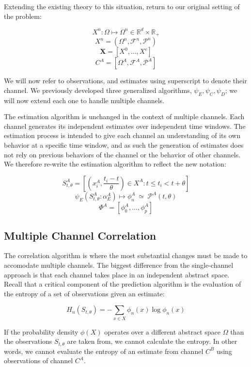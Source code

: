 \documentclass[10pt]{article}
\begin{document}
Extending the existing theory to this situation, return to our original setting of the problem:

\[ X^n : \Omega \mapsto \Omega^n \in \mathbb{R}^d \times \mathbb{R}_+ \]
\[ X^n = (\Omega^n,\mathcal{F}^n,\mathcal{P}^n) \]
\[ \mathbf{X} = [X^0,...,X^c]   \]
\[ C^A = [\Omega^A,\mathcal{F}^A,\mathcal{P}^A] \]


We will now refer to observations, and estimates using superscript to denote their channel.  We previously developed three generalized algorithms, \(\psi_E, \psi_C, \psi_D \); we will now extend each one to handle multiple channels.

The estimation algorithm is unchanged in the context of multiple channels.  Each channel generates its independent estimates over independent time windows.  The estimation process is intended to give each channel an understanding of its own behavior at a specific time window, and as such the generation of estimates does not rely on previous behaviors of the channel or the behavior of other channels.  We therefore re-write the estimation algorithm to reflect the new notation:

\begin{equation} S_{t,\theta}^A = \left[ (x_i^A,\frac{t_i - t}{\theta}) \in X^A : t \le t_i < t+\theta \right] \end{equation}
\[ \psi_E( S_{t,\theta}^A:\alpha_E^A ) \mapsto \phi_n^A \ \simeq \ \mathcal{P}^A(t,\theta)  \]
\[ \Phi^A = [\phi_0^A,...,\phi_p^A ] \nonumber \]

\subsection{Multiple Channel Correlation}

The correlation algorithm is where the most substantial changes must be made to accomodate multiple channels.  The biggest difference from the single-channel approach is that each channel takes place in an independent abstract space.  Recall that a critical component of the prediction algorithm is the evaluation of the entropy of a set of observations given an estimate:

\[ H_n(S_{t,\theta}) = -\sum_{x \in X} \phi_n(x) \log \phi_n(x) \]

If the probability density \(\phi(X) \) operates over a different abstract space \(\Omega \) than the observations \(S_{t,\theta} \) are taken from, we cannot calculate the entropy.  In other words, we cannot evaluate the entropy of an estimate from channel \(C^B \) using observations of channel \(C^A \).  
\end{document}
